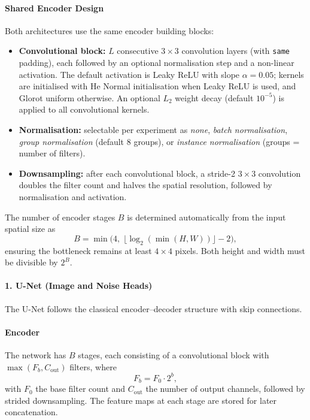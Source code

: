 \documentclass{aa}
\begin{document}
\paragraph{Shared Encoder Design}

Both architectures use the same encoder building blocks:
\begin{itemize}
    \item \textbf{Convolutional block:} $L$ consecutive $3 \times 3$ convolution layers (with \texttt{same} padding), each followed by an optional normalisation step and a non-linear activation. The default activation is Leaky ReLU with slope $\alpha = 0.05$; kernels are initialised with He Normal initialisation when Leaky ReLU is used, and Glorot uniform otherwise. An optional $L_2$ weight decay (default $10^{-5}$) is applied to all convolutional kernels.

    \item \textbf{Normalisation:} selectable per experiment as \emph{none}, \emph{batch normalisation}, \emph{group normalisation} (default 8 groups), or \emph{instance normalisation} (groups = number of filters).

    \item \textbf{Downsampling:} after each convolutional block, a stride-2 $3 \times 3$ convolution doubles the filter count and halves the spatial resolution, followed by normalisation and activation.
\end{itemize}

The number of encoder stages $B$ is determined automatically from the input spatial size as
\begin{equation}
B = \min\!\bigl(4,\; \lfloor \log_2(\min(H, W)) \rfloor - 2\bigr),
\end{equation}
ensuring the bottleneck remains at least $4 \times 4$ pixels. Both height and width must be divisible by $2^B$.

\paragraph{1. U-Net (Image and Noise Heads)}

The U-Net follows the classical encoder--decoder structure with skip connections.

\paragraph{Encoder}

The network has $B$ stages, each consisting of a convolutional block with $\max(F_b, C_\mathrm{out})$ filters, where
\begin{equation}
F_b = F_0 \cdot 2^b,
\end{equation}
with $F_0$ the base filter count and $C_\mathrm{out}$ the number of output channels, followed by strided downsampling. The feature maps at each stage are stored for later concatenation.
\end{document}
